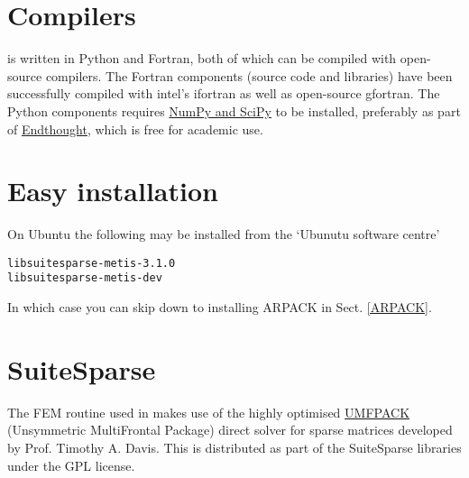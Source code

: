 \documentclass[11pt,a4paper,twoside]{report}
\begin{document}
\section{Compilers}
\CodeName is written in Python and Fortran, both of which can be compiled with open-source compilers. 
The Fortran components (\CodeName source code and libraries) have been successfully compiled with intel's ifortran as well as open-source gfortran. 
The Python components requires \href{http://scipy.org/}{NumPy and SciPy} to be installed, preferably as part of \href{https://www.enthought.com/products/epd/}{Endthought}, which is free for academic use.



\section{Easy installation}
On Ubuntu the following may be installed from the `Ubunutu software centre'
\begin{lstlisting}
libsuitesparse-metis-3.1.0
libsuitesparse-metis-dev
\end{lstlisting}
In which case you can skip down to installing ARPACK in Sect. \ref{ARPACK}.



\section{SuiteSparse}
The FEM routine used in \CodeName makes use of the highly optimised \href{https://www.cise.ufl.edu/research/sparse/umfpack/}{UMFPACK} (Unsymmetric MultiFrontal Package) direct solver for sparse matrices developed by Prof. Timothy A. Davis. This is distributed as part of the  SuiteSparse libraries under the GPL license.
\end{document}
